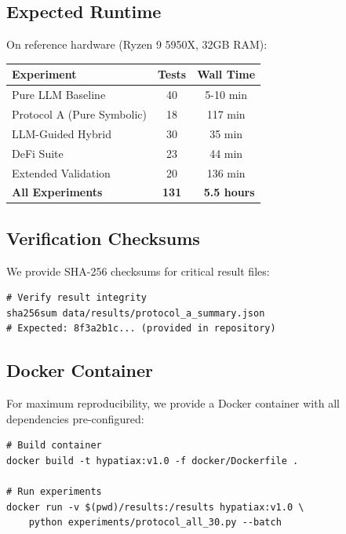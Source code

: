 \documentclass[twoside,11pt]{article}
\begin{document}
\subsection{Expected Runtime}

On reference hardware (Ryzen 9 5950X, 32GB RAM):

\begin{table}[H]
\centering
\begin{tabular}{@{}lcc@{}}
\toprule
\textbf{Experiment} & \textbf{Tests} & \textbf{Wall Time} \\
\midrule
Pure LLM Baseline & 40 & 5-10 min \\
Protocol A (Pure Symbolic) & 18 & 117 min \\
LLM-Guided Hybrid & 30 & 35 min \\
DeFi Suite & 23 & 44 min \\
Extended Validation & 20 & 136 min \\
\midrule
\textbf{All Experiments} & \textbf{131} & \textbf{~5.5 hours} \\
\bottomrule
\end{tabular}
\end{table}

\subsection{Verification Checksums}

We provide SHA-256 checksums for critical result files:

\begin{small}
\begin{verbatim}
# Verify result integrity
sha256sum data/results/protocol_a_summary.json
# Expected: 8f3a2b1c... (provided in repository)
\end{verbatim}
\end{small}

\subsection{Docker Container}

For maximum reproducibility, we provide a Docker container with all dependencies pre-configured:

\begin{small}
\begin{verbatim}
# Build container
docker build -t hypatiax:v1.0 -f docker/Dockerfile .

# Run experiments
docker run -v $(pwd)/results:/results hypatiax:v1.0 \
    python experiments/protocol_all_30.py --batch
\end{verbatim}
\end{small}
\end{document}
